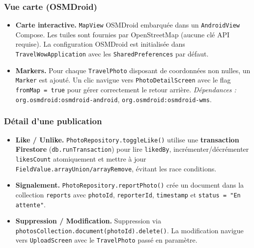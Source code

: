 \documentclass[a4paper, 12pt]{article}
\begin{document}
\begin{justify}
\begin{itemize}
\end{itemize}

\subsubsection*{Vue carte (OSMDroid)}

\begin{itemize}

    \item \textbf{Carte interactive.}
    \texttt{MapView} OSMDroid embarquée dans un \texttt{AndroidView} Compose. Les tuiles sont fournies par OpenStreetMap (aucune clé API requise). La configuration OSMDroid est initialisée dans \texttt{TravelWowApplication} avec les \texttt{SharedPreferences} par défaut.

    \item \textbf{Markers.}
    Pour chaque \texttt{TravelPhoto} disposant de coordonnées non nulles, un \texttt{Marker} est ajouté. Un clic navigue vers \texttt{PhotoDetailScreen} avec le flag \texttt{fromMap = true} pour gérer correctement le retour arrière.
    \newline\textit{Dépendances :} \texttt{org.\allowbreak{}osmdroid:\allowbreak{}osmdroid-android}, \texttt{org.\allowbreak{}osmdroid:\allowbreak{}osmdroid-wms}.

\end{itemize}

\subsubsection*{Détail d'une publication}

\begin{itemize}

    \item \textbf{Like / Unlike.}
    \texttt{PhotoRepository.\allowbreak{}toggleLike()} utilise une \textbf{transaction Firestore} (\texttt{db.\allowbreak{}runTransaction}) pour lire \texttt{likedBy}, incrémenter/décrémenter \texttt{likesCount} atomiquement et mettre à jour \texttt{FieldValue.\allowbreak{}arrayUnion/\allowbreak{}arrayRemove}, évitant les race conditions.

    \item \textbf{Signalement.}
    \texttt{PhotoRepository.\allowbreak{}reportPhoto()} crée un document dans la collection \texttt{reports} avec \texttt{photoId}, \texttt{reporterId}, \texttt{timestamp} et \texttt{status = "En attente"}.

    \item \textbf{Suppression / Modification.}
    Suppression via \texttt{photosCollection.\allowbreak{}document(photoId).\allowbreak{}delete()}. La modification navigue vers \texttt{UploadScreen} avec le \texttt{TravelPhoto} passé en paramètre.


\end{itemize}
\end{justify}
\end{document}
